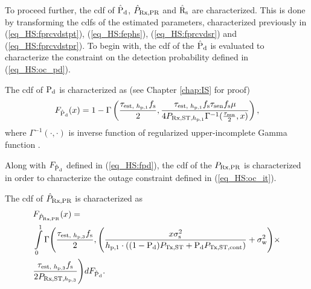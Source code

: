 To proceed further, the cdf of $\hat{\text{P}}_{\text{d}}$, $\hat{P}_{\text{Rx,PR}}$ and $\hat{\text{{R}}}_{\text{s}}$ are characterized. This is done by transforming the cdfs of the estimated parameters, characterized previously in (\ref{eq_HS:fprcvdstpt}), (\ref{eq_HS:fephs}), (\ref{eq_HS:fprcvdsr}) and (\ref{eq_HS:fprcvdstpr}). To begin with, the cdf of the $\hat{\text{P}}_{\text{d}}$ is evaluated to characterize the constraint on the detection probability defined in (\ref{eq_HS:oc_pd}). 
\begin{lemma} \label{lm_HS:lem1}
\normalfont
The cdf of $\text{P}_{\text{d}}$ is characterized as (see Chapter \ref{chap:IS} for proof) 
\begin{align}
F_{\hat{\text{P}}_{\text{d}}}(x) = 1 - \Gamma \left(\frac{\tau_{\text{est, $h_{\text{p,1}}$}} f_{\text{s}}}{2}, \frac{\tau_{\text{est, $h_{\text{p,1}}$}} f_{\text{s}} \tau_{\text{sen}} f_{\text{s}} \mu}{4 P_{\text{Rx,ST,$h_{\text{p,1}}$}} \Gamma^{-1}(\frac{\tau_{\text{sen}}}{2}, x) } \right), 
\label{eq_HS:fpd}
\end{align}
where $\Gamma^{-1}(\cdot, \cdot)$ is inverse function of regularized upper-incomplete Gamma function \cite{grad}.
\end{lemma}
Along with $F_{\hat{\text{P}}_{\text{d}}}$ defined in (\ref{eq_HS:fpd}), the cdf of the $P_{\text{Rx,PR}}$ is characterized in order to characterize the outage constraint defined in (\ref{eq_HS:oc_it}). 
\begin{lemma} \label{lm_HS:lem2}
\normalfont
The cdf of $\hat{P}_{\text{Rx,PR}}$ is characterized as 
\begin{align}
&F_{\hat{P}_{\text{Rx,PR}}} (x) = \nonumber \\ 
&\int\limits_0^1 \Gamma \Bigg(\frac{\tau_{\text{est, $h_{\text{p,3}}$}} f_{\text{s}}}{2} , \Bigg( \frac{x \sigma^2_{\text{s}}}{h_{\text{p,1}} \cdot ((1 - \text{P}_{\text{d}}) P_{\text{Tx,ST}} + \text{P}_{\text{d}} P_{\text{Tx,ST,cont}})} + \sigma^2_{\text{w}}  \Bigg) \times \nonumber \\ 
&\frac{\tau_{\text{est, $h_{\text{p,3}}$}} f_{\text{s}}}{2 P_{\text{Rx,ST,$h_{\text{p,3}}$}}}  \Bigg) dF_{\hat{\text{P}}_{\text{d}}}. 
\label{eq_HS:fprcvdpr}
\end{align}
\end{lemma}

